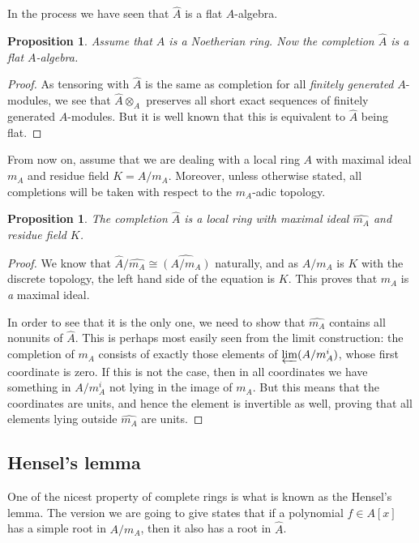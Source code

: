 \documentclass[12pt,a4paper,leqno]{article}
\newcommand{\plim}{\varprojlim}
\theoremstyle{plain}
\newtheorem{prop}[theo]{Proposition}
\theoremstyle{definition}
\theoremstyle{remark}
\begin{document}
In the process we have seen that $\widehat A$ is a flat $A$-algebra.

\begin{prop}
Assume that $A$ is a Noetherian ring. Now the completion $\widehat A$ is a flat $A$-algebra.
\end{prop}
\begin{proof}
As tensoring with $\widehat A$ is the same as completion for all \emph{finitely generated} $A$-modules, we see that $\widehat A \otimes_A $ preserves all short exact sequences of finitely generated $A$-modules. But it is well known that this is equivalent to $\widehat A$ being flat.
\end{proof}

From now on, assume that we are dealing with a local ring $A$ with maximal ideal $m_A$ and residue field $K = A / m_A$. Moreover, unless otherwise stated, all completions will be taken with respect to the $m_A$-adic topology. 

\begin{prop}
The completion $\widehat A $ is a local ring with maximal ideal $\widehat{m_A}$ and residue field $K$.
\end{prop}
\begin{proof}
We know that $\widehat A / \widehat{m_A} \cong \widehat{(A/m_A)}$ naturally, and as $A / m_A$ is $K$ with the discrete topology, the left hand side of the equation is $K$. This proves that $m_A$ is \emph{a} maximal ideal. 

In order to see that it is the only one, we need to show that $\widehat {m_A}$ contains all nonunits of $\widehat A$. This is perhaps most easily seen from the limit construction: the completion of $m_A$ consists of exactly those elements of $\plim (A / m_A^i)$, whose first coordinate is zero. If this is not the case, then in all coordinates we have something in $A / m_A^i$ not lying in the image of $m_A$. But this means that the coordinates are units, and hence the element is invertible as well, proving that all elements lying outside $\widehat{m_A}$ are units.
\end{proof} 

\subsection{Hensel's lemma}

One of the nicest property of complete rings is what is known as the Hensel's lemma. The version we are going to give states that if a polynomial $f \in A[x]$ has a simple root in $A/m_A$, then it also has a root in $\widehat A$.
\end{document}
